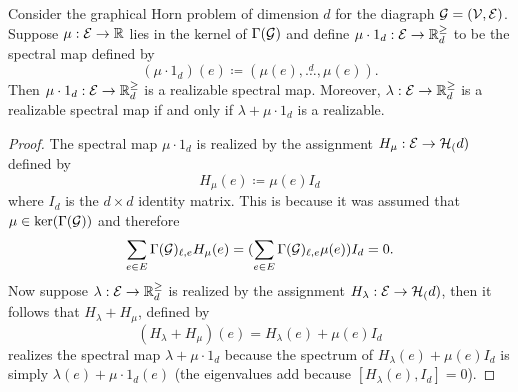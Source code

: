 \documentclass[notitlepage, 10pt]{article}
\begin{document}
\begin{lem}
    \label{lem:ker_shift}
    Consider the graphical Horn problem of dimension $d$ for the diagraph $\mathcal G = (\mathcal V, \mathcal E)$.
    Suppose $\mu : \mathcal E \to \mathbb R$ lies in the kernel of $\Gamma(\mathcal G)$ and define $\mu \cdot 1_{d} : \mathcal E \to \mathbb R^{\geq}_{d}$ to be the spectral map defined by
    \begin{equation}
        (\mu \cdot 1_d)(e) \coloneqq (\mu(e), \stackrel{d}{\ldots}, \mu(e)).
    \end{equation}
    Then $\mu \cdot 1_{d} : \mathcal E \to \mathbb R^{\geq}_{d}$ is a realizable spectral map.
    Moreover, $\lambda : \mathcal E \to \mathbb R^{\geq}_{d}$ is a realizable spectral map if and only if $\lambda + \mu \cdot 1_{d}$ is a realizable.
\end{lem}
\begin{proof}
    The spectral map $\mu \cdot 1_d$ is realized by the assignment $H_{\mu} : \mathcal E \to \mathcal H_{(}d)$ defined by
    \begin{equation}
        H_{\mu}(e) \coloneqq \mu(e)I_{d}
    \end{equation}
    where $I_{d}$ is the $d\times d$ identity matrix.
    This is because it was assumed that $\mu \in \ker(\Gamma(\mathcal G))$ and therefore
    \begin{equation}
        \sum_{e\in E}\Gamma(\mathcal G)_{\ell, e}H_{\mu}(e) = (\sum_{e\in E}\Gamma(\mathcal G)_{\ell, e}\mu(e))I_{d} = 0.
    \end{equation}
    Now suppose $\lambda : \mathcal E \to \mathbb R^{\geq}_{d}$ is realized by the assignment $H_{\lambda} : \mathcal E \to \mathcal H_{(}d)$, then it follows that $H_{\lambda}+H_{\mu}$, defined by
    \begin{equation}
        (H_{\lambda}+H_{\mu})(e) = H_{\lambda}(e) + \mu(e) I_d
    \end{equation} 
    realizes the spectral map $\lambda + \mu\cdot 1_d$ because the spectrum of $H_{\lambda}(e) + \mu(e) I_d$ is simply $\lambda(e) + \mu\cdot 1_d(e)$ (the eigenvalues add because $[H_{\lambda}(e), I_d] = 0$).
\end{proof}
\end{document}
